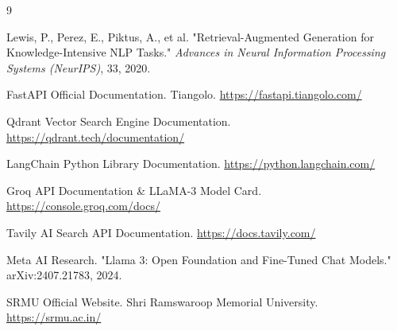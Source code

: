 \documentclass[12pt,a4paper]{report}
\begin{document}
\begin{thebibliography}{9}

Lewis, P., Perez, E., Piktus, A., et al. "Retrieval-Augmented Generation for Knowledge-Intensive NLP Tasks." \textit{Advances in Neural Information Processing Systems (NeurIPS)}, 33, 2020.

FastAPI Official Documentation. Tiangolo. \url{https://fastapi.tiangolo.com/}

Qdrant Vector Search Engine Documentation. \url{https://qdrant.tech/documentation/}

LangChain Python Library Documentation. \url{https://python.langchain.com/}

Groq API Documentation \& LLaMA-3 Model Card. \url{https://console.groq.com/docs/}

Tavily AI Search API Documentation. \url{https://docs.tavily.com/}

Meta AI Research. "Llama 3: Open Foundation and Fine-Tuned Chat Models." arXiv:2407.21783, 2024.

SRMU Official Website. Shri Ramswaroop Memorial University. \url{https://srmu.ac.in/}

\end{thebibliography}
\end{document}
